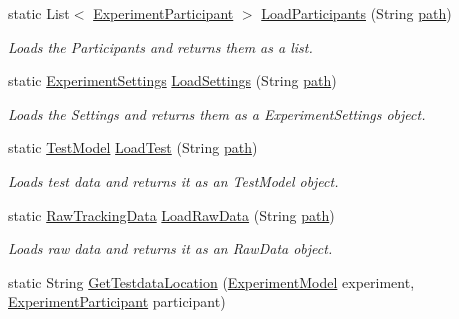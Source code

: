 \begin{DoxyCompactItemize}
static List$<$ \hyperlink{class_web_analyzer_1_1_models_1_1_base_1_1_experiment_participant}{Experiment\+Participant} $>$ \hyperlink{class_web_analyzer_1_1_controller_1_1_load_controller_adc9166c45bf2b2a3fe1b89dc72e539bc}{Load\+Participants} (String \hyperlink{bin_2x64_2_release_2_u_i_2_h_t_m_l_resources_2js_2src_2create__experiment_8js_aa72e0c8a20e6bcc571d3a1c51846e627}{path})
\begin{DoxyCompactList}\small\item\em Loads the Participants and returns them as a list. \end{DoxyCompactList}\item 
static \hyperlink{class_web_analyzer_1_1_models_1_1_settings_model_1_1_experiment_settings}{Experiment\+Settings} \hyperlink{class_web_analyzer_1_1_controller_1_1_load_controller_aac7916dc05a2869790dd010a8f5477d4}{Load\+Settings} (String \hyperlink{bin_2x64_2_release_2_u_i_2_h_t_m_l_resources_2js_2src_2create__experiment_8js_aa72e0c8a20e6bcc571d3a1c51846e627}{path})
\begin{DoxyCompactList}\small\item\em Loads the Settings and returns them as a Experiment\+Settings object. \end{DoxyCompactList}\item 
static \hyperlink{class_web_analyzer_1_1_models_1_1_data_model_1_1_test_model}{Test\+Model} \hyperlink{class_web_analyzer_1_1_controller_1_1_load_controller_ac708d0fc98accf17574e97f1e59a7dc9}{Load\+Test} (String \hyperlink{bin_2x64_2_release_2_u_i_2_h_t_m_l_resources_2js_2src_2create__experiment_8js_aa72e0c8a20e6bcc571d3a1c51846e627}{path})
\begin{DoxyCompactList}\small\item\em Loads test data and returns it as an Test\+Model object. \end{DoxyCompactList}\item 
static \hyperlink{class_web_analyzer_1_1_models_1_1_base_1_1_raw_tracking_data}{Raw\+Tracking\+Data} \hyperlink{class_web_analyzer_1_1_controller_1_1_load_controller_a3c0d32fd4c9a0137ecc56d8950f03e68}{Load\+Raw\+Data} (String \hyperlink{bin_2x64_2_release_2_u_i_2_h_t_m_l_resources_2js_2src_2create__experiment_8js_aa72e0c8a20e6bcc571d3a1c51846e627}{path})
\begin{DoxyCompactList}\small\item\em Loads raw data and returns it as an Raw\+Data object. \end{DoxyCompactList}\item 
static String \hyperlink{class_web_analyzer_1_1_controller_1_1_load_controller_a3f5424c02e41a6ea9e0edfd300dc3442}{Get\+Testdata\+Location} (\hyperlink{class_web_analyzer_1_1_models_1_1_base_1_1_experiment_model}{Experiment\+Model} experiment, \hyperlink{class_web_analyzer_1_1_models_1_1_base_1_1_experiment_participant}{Experiment\+Participant} participant)

\end{DoxyCompactItemize}
